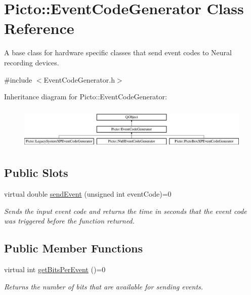 \hypertarget{class_picto_1_1_event_code_generator}{\section{Picto\-:\-:Event\-Code\-Generator Class Reference}
\label{class_picto_1_1_event_code_generator}
}


A base class for hardware specific classes that send event codes to Neural recording devices.  




{\ttfamily \#include $<$Event\-Code\-Generator.\-h$>$}

Inheritance diagram for Picto\-:\-:Event\-Code\-Generator\-:\begin{figure}[H]
\begin{center}
\leavevmode
\includegraphics[height=2.058824cm]{class_picto_1_1_event_code_generator}
\end{center}
\end{figure}
\subsection*{Public Slots}
\begin{DoxyCompactItemize}
\item 
virtual double \hyperlink{class_picto_1_1_event_code_generator_adf6a7d68b44bcecec9b7093c723cebb9}{send\-Event} (unsigned int event\-Code)=0
\begin{DoxyCompactList}\small\item\em Sends the input event code and returns the time in seconds that the event code was triggered before the function returned. \end{DoxyCompactList}\end{DoxyCompactItemize}
\subsection*{Public Member Functions}
\begin{DoxyCompactItemize}
\item 
virtual int \hyperlink{class_picto_1_1_event_code_generator_aa7c20e4bd4c1b3f403ea555e1a2de422}{get\-Bits\-Per\-Event} ()=0
\begin{DoxyCompactList}\small\item\em Returns the number of bits that are available for sending events. \end{DoxyCompactList}\end{DoxyCompactItemize}


